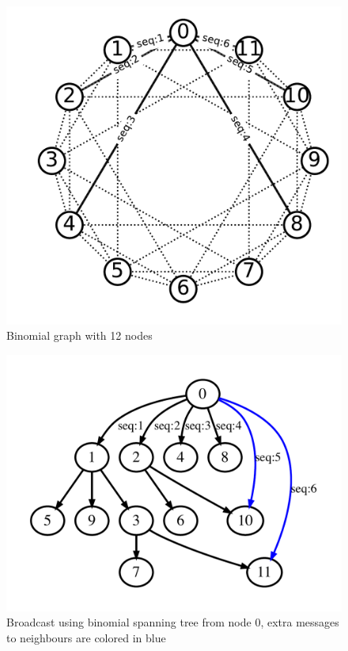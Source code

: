 \documentclass[sigconf]{acmart}
\begin{document}
\begin{figure}
  \centering
  \includegraphics[width=\linewidth]{BMG_seq.pdf}
  \caption{Binomial graph with 12 nodes}
  \label{fig:bmg}
\end{figure}
\begin{figure}
  \centering
  \includegraphics[width=\linewidth]{reorder_span.pdf}
  \caption{Broadcast using binomial spanning tree from node 0, extra messages to neighbours are colored in blue }
  \label{fig:reorder_span}
\end{figure}
\end{document}
